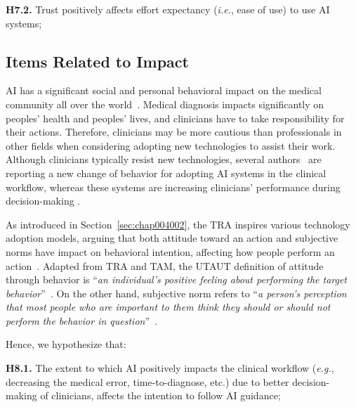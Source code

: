 \vspace{2.25mm}

\noindent
{\bf H7.2.} Trust positively affects effort expectancy ({\it i.e.}, ease of use) to use AI systems;

\subsection{Items Related to Impact}
\label{sec:chap004003003}

AI has a significant social and personal behavioral impact on the medical community all over the world~\cite{Fan2020}.
Medical diagnosis impacts significantly on peoples' health and peoples' lives, and clinicians have to take responsibility for their actions.
Therefore, clinicians may be more cautious than professionals in other fields when considering adopting new technologies to assist their work.
Although clinicians typically resist new technologies, several authors~\cite{doi:10.1148/ryai.2020190043, WAYMEL2019327} are reporting a new change of behavior for adopting AI systems in the clinical workflow, whereas these systems are increasing clinicians' performance during decision-making \cite{CALISTO2021102607}.

As introduced in Section~\ref{sec:chap004002}, the TRA inspires various technology adoption models, arguing that both attitude toward an action and subjective norms have impact on behavioral intention, affecting how people perform an action~\cite{https://doi.org/10.1002/hbe2.195}.
Adapted from TRA and TAM, the UTAUT definition of attitude through behavior is ``{\it an individual's positive feeling about performing the target behavior}''~\cite{10.2307/30036540}.
On the other hand, subjective norm refers to ``{\it a person's perception that most people who are important to them think they should or should not perform the behavior in question}''~\cite{10.2307/30036540}.

\vspace{2.25mm}

\noindent
Hence, we hypothesize that:

\vspace{2.25mm}

\noindent
{\bf H8.1.} The extent to which AI positively impacts the clinical workflow ({\it e.g.}, decreasing the medical error, time-to-diagnose, etc.) due to better decision-making of clinicians, affects the intention to follow AI guidance;

\vspace{2.25mm}

